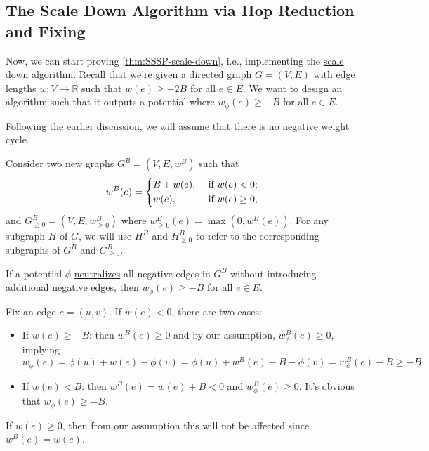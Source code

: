 \subsection{The Scale Down Algorithm via Hop Reduction and Fixing}
Now, we can start proving \autoref{thm:SSSP-scale-down}, i.e., implementing the \hyperref[algo:scale-down]{scale down algorithm}. Recall that we're given a directed graph \(G = (V, E)\) with edge lengths \(w \colon V \to \mathbb{R} \) such that \(w(e) \geq -2B\) for all \(e \in E\). We want to design an algorithm such that it outputs a potential where \(w_{\phi } (e) \geq -B\) for all \(e \in E\).

\begin{note}
	Following the earlier discussion, we will assume that there is no negative weight cycle.
\end{note}

Consider two new graphs \(G^B = (V, E, w^B)\) such that
\[
	w^B (e)
	= \begin{dcases}
		B + w(e), & \text{ if } w(e) < 0 ;    \\
		w(e),     & \text{ if } w(e) \geq 0 ,
	\end{dcases}
\]
and \(G^B_{\geq 0} = (V, E, w^B_{\geq 0})\) where \(w^B_{\geq 0} (e) = \max (0, w^B(e))\). For any subgraph \(H\) of \(G\), we will use \(H^B\) and \(H^B_{\geq 0}\) to refer to the corresponding subgraphs of \(G^B\) and \(G^B_{\geq 0}\).

\begin{claim}
	If a potential \(\phi \) \hyperref[def:neutralize]{neutralizes} all negative edges in \(G^B\) without introducing additional negative edges, then \(w_{\phi } (e) \geq -B\) for all \(e \in E\).
\end{claim}
\begin{explanation}
	Fix an edge \(e = (u, v)\). If \(w(e) < 0\), there are two cases:
	\begin{itemize}
		\item If \(w(e) \geq -B\): then \(w^B(e) \geq 0\) and by our assumption, \(w^B_{\phi }(e) \geq 0\), implying
		      \[
			      w_{\phi }(e)
			      = \phi (u) + w(e) - \phi (v)
			      = \phi (u) + w^B(e) - B - \phi (v)
			      = w_{\phi }^B(e) - B
			      \geq -B.
		      \]
		\item If \(w(e) < B\): then \(w^B(e) = w(e) + B < 0\) and \(w_{\phi }^B(e) \geq 0 \). It's obvious that \(w_{\phi }(e) \geq -B \).
	\end{itemize}
	If \(w(e) \geq 0\), then from our assumption this will not be affected since \(w^B(e) = w(e)\).
\end{explanation}


